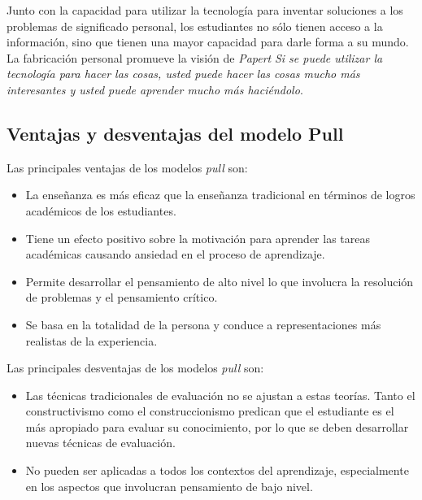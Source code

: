 \begin{itemize}
    Junto con la capacidad para utilizar la tecnología para inventar soluciones
    a los problemas de significado personal, los estudiantes no sólo tienen
    acceso a la información, sino que tienen una mayor capacidad para darle
    forma a su mundo. La fabricación personal promueve la visión de
    \textit{Papert} \emph{Si se puede utilizar la tecnología para hacer las
        cosas, usted puede hacer las cosas mucho más interesantes y usted puede
        aprender mucho más haciéndolo}\cite{papertian:const}.

\end{itemize}

\subsection{Ventajas y desventajas del modelo Pull}

Las principales ventajas de los modelos \emph{pull} son:

\begin{itemize}

\item La enseñanza es más eficaz que la enseñanza tradicional en términos de
    logros académicos de los estudiantes\cite{kim2005effects}.

\item Tiene un efecto positivo sobre la motivación para aprender las tareas
    académicas causando ansiedad en el proceso de
    aprendizaje\cite{kim2005effects}.


\item Permite desarrollar el pensamiento de alto nivel lo que involucra la
    resolución de problemas y el pensamiento
    crítico\cite{wilson2012constructivism}.

\item Se basa en la totalidad de la persona y conduce a representaciones más
    realistas de la experiencia\cite{wilson2012constructivism}.

\end{itemize}

Las principales desventajas de los modelos \emph{pull} son:

\begin{itemize}

\item Las técnicas tradicionales de evaluación no se ajustan a estas teorías.
    Tanto el constructivismo como el construccionismo predican que el estudiante
    es el más apropiado para evaluar su conocimiento, por lo que se deben
    desarrollar nuevas técnicas de evaluación\cite{lai1995implications}.

\item No pueden ser aplicadas a todos los contextos del
    aprendizaje\cite{lai1995implications}, especialmente en los aspectos que
    involucran pensamiento de bajo nivel.

\end{itemize}
